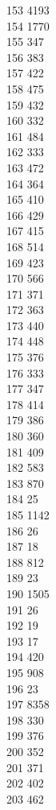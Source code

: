 { 153	4193 \\
 154	1770 \\
 155	347 \\
 156	383 \\
 157	422 \\
 158	475 \\
 159	432 \\
 160	332 \\
 161	484 \\
 162	333 \\
 163	472 \\
 164	364 \\
 165	410 \\
 166	429 \\
 167	415 \\
 168	514 \\
 169	423 \\
 170	566 \\
 171	371 \\
 172	363 \\
 173	440 \\
 174	448 \\
 175	376 \\
 176	333 \\
 177	347 \\
 178	414 \\
 179	386 \\
 180	360 \\
 181	409 \\
 182	583 \\
 183	870 \\
 184	25 \\
 185	1142 \\
 186	26 \\
 187	18 \\
 188	812 \\
 189	23 \\
 190	1505 \\
 191	26 \\
 192	19 \\
 193	17 \\
 194	420 \\
 195	908 \\
 196	23 \\
 197	8358 \\
 198	330 \\
 199	376 \\
 200	352 \\
 201	371 \\
 202	402 \\
 203	462 \\
}
